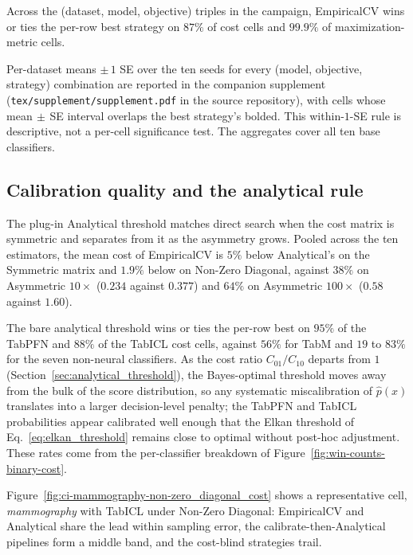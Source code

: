 

Across the (dataset, model, objective) triples in the campaign, EmpiricalCV wins or ties the per-row best strategy on $87\%$ of cost cells and $99.9\%$ of maximization-metric cells.

Per-dataset means $\pm\,1$ SE over the ten seeds for every (model, objective, strategy) combination are reported in the companion supplement (\texttt{tex/supplement/supplement.pdf} in the source repository), with cells whose mean$\,\pm\,$SE interval overlaps the best strategy's bolded. This within-$1$-SE rule is descriptive, not a per-cell significance test. The aggregates cover all ten base classifiers.

\subsection{Calibration quality and the analytical rule}

The plug-in Analytical threshold matches direct search when the cost matrix is symmetric and separates from it as the asymmetry grows. Pooled across the ten estimators, the mean cost of EmpiricalCV is $5\%$ below Analytical's on the Symmetric matrix and $1.9\%$ below on Non-Zero Diagonal, against $38\%$ on Asymmetric $10\times$ ($0.234$ against $0.377$) and $64\%$ on Asymmetric $100\times$ ($0.58$ against $1.60$).

The bare analytical threshold wins or ties the per-row best on $95\%$ of the TabPFN and $88\%$ of the TabICL cost cells, against $56\%$ for TabM and $19$ to $83\%$ for the seven non-neural classifiers. As the cost ratio $C_{01}/C_{10}$ departs from $1$ (Section~\ref{sec:analytical_threshold}), the Bayes-optimal threshold moves away from the bulk of the score distribution, so any systematic miscalibration of $\hat{p}(x)$ translates into a larger decision-level penalty; the TabPFN and TabICL probabilities appear calibrated well enough that the Elkan threshold of Eq.~\ref{eq:elkan_threshold} remains close to optimal without post-hoc adjustment. These rates come from the per-classifier breakdown of Figure~\ref{fig:win-counts-binary-cost}.

Figure~\ref{fig:ci-mammography-non-zero_diagonal_cost} shows a representative cell, \textit{mammography} with TabICL under Non-Zero Diagonal: EmpiricalCV and Analytical share the lead within sampling error, the calibrate-then-Analytical pipelines form a middle band, and the cost-blind strategies trail.



